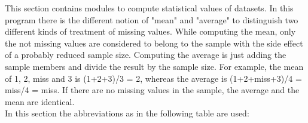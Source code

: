 This section contains modules to compute statistical values of datasets.
In this program there is the different notion of "mean" and "average"
to distinguish two different kinds of treatment of missing values.
While computing the mean, only the not missing values are considered
to belong to the sample with the side effect of a probably reduced sample
size. Computing the average is just adding the sample members and divide
the result by the sample size. For example, the mean of 1, 2, miss and 3
is (1+2+3)/3 = 2, whereas the average is (1+2+miss+3)/4 = miss/4 = miss.
If there are no missing values in the sample, the average and the mean are
identical.\\
In this section the abbreviations as in the following table are used:

\vspace{3mm}

